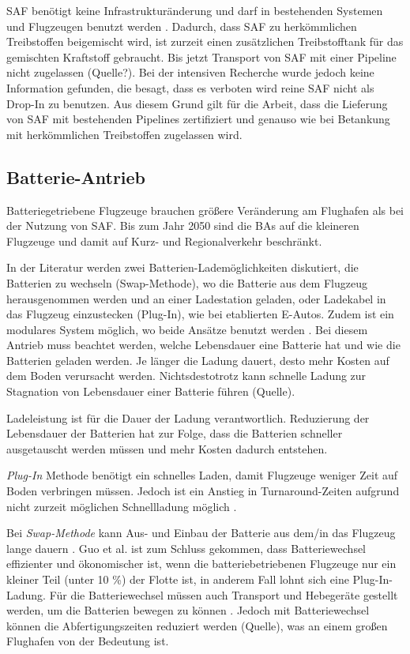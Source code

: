 SAF benötigt keine Infrastrukturänderung und darf in bestehenden Systemen und Flugzeugen benutzt werden \cite{dalmia2022powering}.
Dadurch, dass SAF zu herkömmlichen Treibstoffen beigemischt wird, ist zurzeit einen zusätzlichen Treibstofftank 
für das gemischten Kraftstoff gebraucht. Bis jetzt Transport von SAF mit einer Pipeline nicht zugelassen (Quelle?).
Bei der intensiven Recherche wurde jedoch keine Information gefunden, die besagt, dass es verboten wird reine SAF nicht als
Drop-In zu benutzen. Aus diesem Grund gilt für die Arbeit, dass die Lieferung von SAF mit bestehenden Pipelines 
zertifiziert und genauso wie bei Betankung mit herkömmlichen Treibstoffen zugelassen wird.

\subsection{Batterie-Antrieb}
Batteriegetriebene Flugzeuge brauchen größere Veränderung am Flughafen als bei der Nutzung von SAF.
Bis zum Jahr 2050 sind die BAs auf die kleineren Flugzeuge und damit auf Kurz- und Regionalverkehr beschränkt. 

In der Literatur werden zwei Batterien-Lademöglichkeiten diskutiert, die Batterien zu wechseln (Swap-Methode), 
wo die Batterie aus dem Flugzeug herausgenommen werden und 
an einer Ladestation geladen, oder Ladekabel in das Flugzeug einzustecken (Plug-In), wie bei etablierten E-Autos.
Zudem ist ein modulares System möglich, wo beide Ansätze benutzt werden \cite{salucci2020optimal}.
%
Bei diesem Antrieb muss beachtet werden, welche Lebensdauer eine Batterie hat und wie die Batterien geladen werden. 
Je länger die Ladung dauert, desto mehr Kosten auf dem Boden verursacht werden. Nichtsdestotrotz kann schnelle Ladung 
zur Stagnation von Lebensdauer einer Batterie führen (Quelle).

Ladeleistung ist für die Dauer der Ladung verantwortlich. Reduzierung der Lebensdauer der Batterien 
hat zur Folge, dass die Batterien schneller ausgetauscht werden müssen
und mehr Kosten dadurch entstehen. 

%
\textit{Plug-In} Methode benötigt ein schnelles Laden, damit Flugzeuge weniger Zeit auf Boden verbringen müssen.
Jedoch ist ein Anstieg in Turnaround-Zeiten aufgrund nicht zurzeit möglichen Schnellladung möglich \cite{avogadro2024demystifying}.

Bei \textit{Swap-Methode} kann Aus- und Einbau der Batterie aus dem/in das Flugzeug lange dauern \cite{dalmia2022powering}. 
Guo et al. \cite{guo2020aviation} ist zum Schluss gekommen, dass Batteriewechsel effizienter und ökonomischer ist, 
wenn die batteriebetriebenen Flugzeuge nur ein kleiner Teil (unter 10 \%) der Flotte ist, in anderem Fall lohnt sich eine Plug-In-Ladung. 
Für die Batteriewechsel müssen auch Transport und Hebegeräte gestellt werden, um die Batterien bewegen zu können \cite{reimers2018introduction}.
Jedoch mit Batteriewechsel können die Abfertigungszeiten reduziert werden (Quelle), was an einem großen Flughafen von der Bedeutung ist. 

